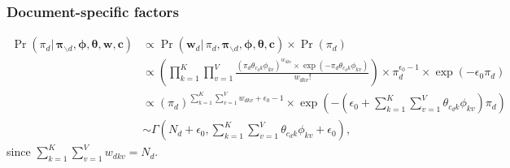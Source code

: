 \documentclass[ba]{imsart}
\numberwithin{equation}{section}
\theoremstyle{plain}
\begin{document}
	\subsubsection{Document-specific factors}
	\begin{equation}
	\begin{aligned}
	\Pr(\pi_d|\,\boldsymbol{\pi}_{\backslash d},\boldsymbol{\phi},\boldsymbol{\theta},\boldsymbol{w},\boldsymbol{c}) & \propto \Pr(\boldsymbol{w}_d|\,\pi_d,\boldsymbol{\pi}_{\backslash d},\boldsymbol{\phi},\boldsymbol{\theta},\boldsymbol{c}) \times \Pr(\pi_d)\\
	& \propto (\prod_{k=1}^K\prod_{v=1}^V \frac{(\pi_{d} \theta_{c_dk}\phi_{kv})^{w_{dkv}}\times \exp(-\pi_{d} \theta_{c_dk}\phi_{kv})}{w_{dkv}!} )\times \pi_d^{\epsilon_0-1} \times \exp(-\epsilon_0 \pi_d)\\
	&\propto (\pi_d)^{\sum_{k=1}^K\sum_{v=1}^V w_{dkv}+\epsilon_0-1}\times \exp(-(\epsilon_0 +\sum_{k=1}^K\sum_{v=1}^V \theta_{c_dk}\phi_{kv})\pi_{d})\\
	&	\sim \Gamma(N_d+\epsilon_0, \sum_{k=1}^K\sum_{v=1}^V\theta_{c_dk} \phi_{kv}+\epsilon_0),
	\end{aligned}	
	\end{equation}
since $\sum_{k=1}^K\sum_{v=1}^V w_{dkv}=N_d$.																	
\end{document}

